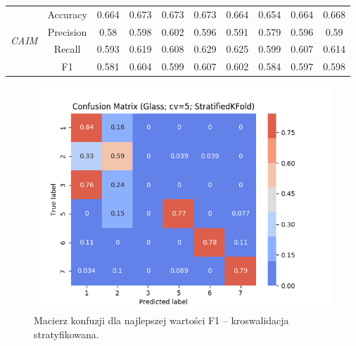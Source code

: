 \begin{table}[H]
\begin{tabular}{|c|c|c|c|c|c|c|c|c|c|}
        \multirow{4}{*}{\textit{CAIM}}  & Accuracy & 0.664 & 0.673 & 0.673 & 0.673 & 0.664 & 0.654 & 0.664 & 0.668 \\ \cline{2-10}
                                     & Precision & 0.58 & 0.598 & 0.602 & 0.596 & 0.591 & 0.579 & 0.596 & 0.59 \\ \cline{2-10}
                                     & Recall & 0.593 & 0.619 & 0.608 & 0.629 & 0.625 & 0.599 & 0.607 & 0.614 \\ \cline{2-10}
                                     & F1 & 0.581 & 0.604 & 0.599 & 0.607 & 0.602 & 0.584 & 0.597 & 0.598 \\ \hline \hline

            \hline
    \end{tabular}
\end{table}

\begin{figure}[H]
    \includegraphics[width=\textwidth]{img/conf_matrices/cm_Glass_cv5_StratifiedKFold.png}
    \caption{Macierz konfuzji dla najlepszej wartości F1 -- kroswalidacja stratyfikowana.}
\end{figure}
